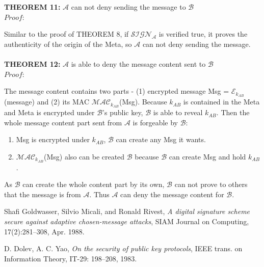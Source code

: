 \\
\\
\textbf{THEOREM 11:} $\mathcal{A}$ can not deny sending the message to $\mathcal{B}$\\
\emph{$Proof:$} \par
Similar to the proof of THEOREM 8, if $\mathcal{SIGN_A}$ is verified true, it proves the authenticity of the origin of the Meta, so $\mathcal{A}$ can not deny sending the message.
\\
\\
\textbf{THEOREM 12:} $\mathcal{A}$ is able to deny the message content sent to $\mathcal{B}$ \\
\emph{$Proof:$} \par
The message content contains two parts - (1) encrypted message Msg =  $\mathcal{E}_{k_{AB}}$(message) and (2) its MAC $\mathcal{MAC}_{k_{AB}}$(Msg). Because $k_{AB}$ is contained in the Meta and Meta is encrypted under $\mathcal{B}$'s public key, $\mathcal{B}$ is able to reveal $k_{AB}$. Then the whole message content part sent from $\mathcal{A}$ is forgeable by $\mathcal{B}$:
\begin{enumerate}
\item Msg is encrypted under $k_{AB}$, $\mathcal{B}$ can create any Msg it wants.
\item $\mathcal{MAC}_{k_{AB}}$(Msg) also can be created $\mathcal{B}$ because $\mathcal{B}$ can create Msg and hold $k_{AB}$.
\end{enumerate}
As $\mathcal{B}$ can create the whole content part by its own, $\mathcal{B}$ can not prove to others that the message is from $\mathcal{A}$. Thus $\mathcal{A}$ can deny the message content for $\mathcal{B}$.

\begin{thebibliography}{9}
  Shafi Goldwasser, Silvio Micali, and Ronald Rivest,
  \emph{A digital signature scheme secure against adaptive chosen-message attacks},  SIAM Journal on Computing,
  17(2):281–308,
  Apr. 1988.
  
  D. Dolev, A. C. Yao,
  \emph{On the security of public key protocols},
  IEEE trans. on Information Theory,
  IT-29: 198–208,
  1983.
\end{thebibliography}